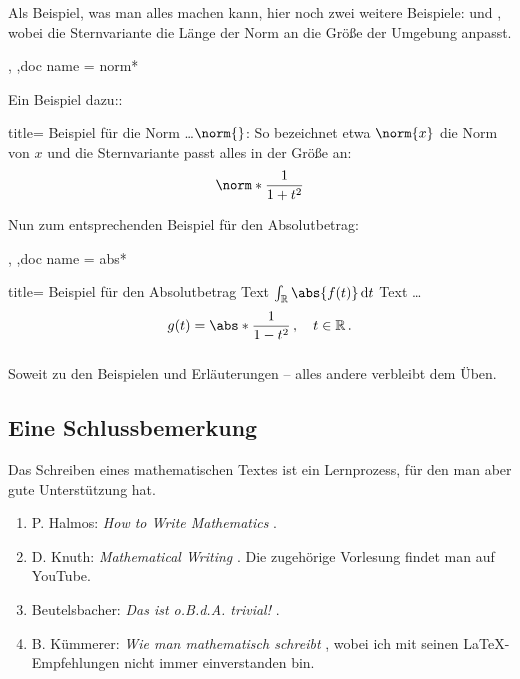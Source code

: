 \begin{refsection}
\subsubsection{}
Als Beispiel, was man alles machen kann, hier noch zwei weitere Beispiele:  und , wobei die Sternvariante die Länge der Norm an die Größe der Umgebung anpasst.
\begin{docCommands}[%
	,doc parameter = \marg{MathSymbol}
	,doc name = norm
	] {
		,{ }
		,doc name = norm*}	
\end{docCommands}
%
Ein Beispiel dazu::
%
\begin{dispExample*}{title= Beispiel für die Norm}
\ldots $ \norm{} $: So bezeichnet etwa  $ \norm{x} $ die Norm von $ x $ und die Sternvariante passt alles in der Größe an: 
%
\[
	\norm*{\frac{ 1 }{ 1 + t^{ 2 } } }
\]
%
\end{dispExample*}
%
Nun zum entsprechenden Beispiel für den Absolutbetrag: 
\begin{docCommands}[%
	,doc parameter = \marg{MathSymbol}
	,doc name = abs
	] {
		,{ }
		,doc name = abs*}	
\end{docCommands}
%
\begin{dispExample*}{title= Beispiel für den Absolutbetrag }
Text $ \int_{ \R } \abs{f(t)} \dt $ Text \ldots
%
\[
	g(t) = \abs*{\frac{ 1 }{ 1 - t^{ 2 } } } \, , \quad t \in \R \, .
\]
%
\end{dispExample*}
\subsubsection{}
Soweit zu den Beispielen und Erläuterungen -- alles andere verbleibt dem Üben.
\subsection*{Eine Schlussbemerkung}
Das Schreiben eines mathematischen Textes ist ein Lernprozess, für den man aber gute Unterstützung hat.
\begin{enumerate}[--]
	\item
	P. Halmos: \emph{How to Write Mathematics} \cite{halmos:how}.
	
	\item
	D. Knuth: \emph{Mathematical Writing} \cite{knuth:writing}.
	Die zugehörige Vorlesung findet man auf YouTube.
	
	\item
	Beutelsbacher: \emph{Das ist o.B.d.A. trivial!} \cite{beutelsbacher:2009}.
	
	\item
	B. Kümmerer: \emph{Wie man mathematisch schreibt} \cite{kuemmerer-2016}, wobei ich mit seinen \LaTeX{}-Empfehlungen nicht immer einverstanden bin.
	
\end{enumerate}
\RaggedRight
\printbibliography
\end{refsection}

